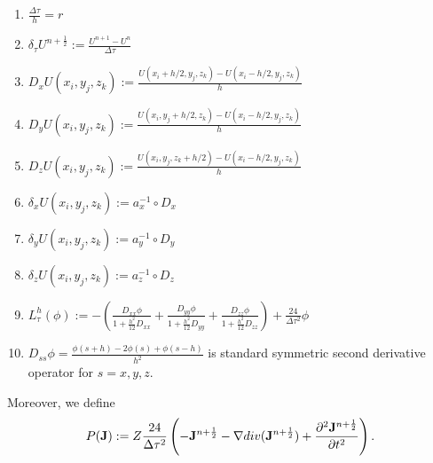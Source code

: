 \documentclass[12pt,reqno]{amsart}
\theoremstyle{definition}
\numberwithin{equation}{section}
\begin{document}
	\begin{enumerate}
		\item $\frac{\Delta \tau }{h}=r$
		\item $\delta_{\tau} U^{n+\frac{1}{2}}:=\frac{U^{n+1}-U^{n}}{\Delta \tau}$
				\item $D_x U(x_i,y_j,z_k):=\frac{U(x_i+h/2,y_j,z_k)-U(x_i-h/2,y_j,z_k)}{h}$
	\item $D_y U(x_i,y_j,z_k):=\frac{U(x_i,y_j+h/2,z_k)-U(x_i-h/2,y_j,z_k)}{h}$
		\item $D_z U(x_i,y_j,z_k):=\frac{U(x_i,y_j,z_k+h/2)-U(x_i-h/2,y_j,z_k)}{h}$

		\item $\delta_x U(x_i,y_j,z_k):=a_x^{-1}\circ D_x$
		\item $\delta_y U(x_i,y_j,z_k):=a_y^{-1}\circ D_y$
		\item 	$\delta_z U(x_i,y_j,z_k):=a_z^{-1}\circ D_z$
		\item $
		L_{\tau}^h(\phi):=-
		\left (
		\frac{D_{xx}\phi}{1+\frac{h^2}{12}D_{xx}}+\frac{D_{yy}\phi}{1+\frac{h^2}{12}D_{yy}}
		+\frac{D_{zz}\phi}{1+\frac{h^2}{12}D_{zz}}\right)
		+\frac{24}{\Delta \tau^2}\phi
		$
		\item
		$D_{ss}\phi=\frac{\phi(s+h)-2\phi(s)+\phi(s-h)}{h^2}$ is standard symmetric second derivative operator for $s=x,y,z$.
	\end{enumerate}
	
	Moreover, we define 
	$$
	P({\bf J}):=Z\frac{24}{\Delta \tau^2}\left ( -{\bf J}^{n+\frac{1}{2}}-\nabla div({\bf J}^{n+\frac{1}{2}})+\frac{\partial^2{\bf J}^{n+\frac{1}{2}}}{\partial t^2}\right ).
	$$
\end{document}
